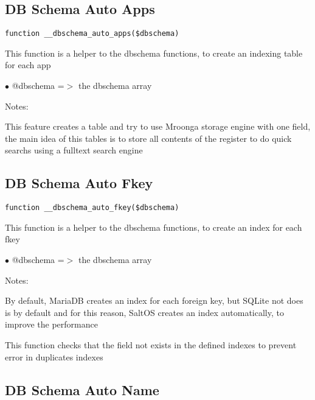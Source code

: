 \documentclass[a4paper]{book}
\begin{document}
\hypertarget{toc92}{}
\subsection{DB Schema Auto Apps}

\begin{lstlisting}
function __dbschema_auto_apps($dbschema)
\end{lstlisting}

This function is a helper to the dbschema functions, to create an indexing table for each app

\begin{compactitem}
\item[\color{myblue}$\bullet$] @dbschema =$>$ the dbschema array
\end{compactitem}

Notes:

This feature creates a table and try to use Mroonga storage engine with one field, the main
idea of this tables is to store all contents of the register to do quick searchs using a
fulltext search engine

\hypertarget{toc93}{}
\subsection{DB Schema Auto Fkey}

\begin{lstlisting}
function __dbschema_auto_fkey($dbschema)
\end{lstlisting}

This function is a helper to the dbschema functions, to create an index for each fkey

\begin{compactitem}
\item[\color{myblue}$\bullet$] @dbschema =$>$ the dbschema array
\end{compactitem}

Notes:

By default, MariaDB creates an index for each foreign key, but SQLite not does is by default
and for this reason, SaltOS creates an index automatically, to improve the performance

This function checks that the field not exists in the defined indexes to prevent error in duplicates
indexes

\hypertarget{toc94}{}
\subsection{DB Schema Auto Name}
\end{document}
